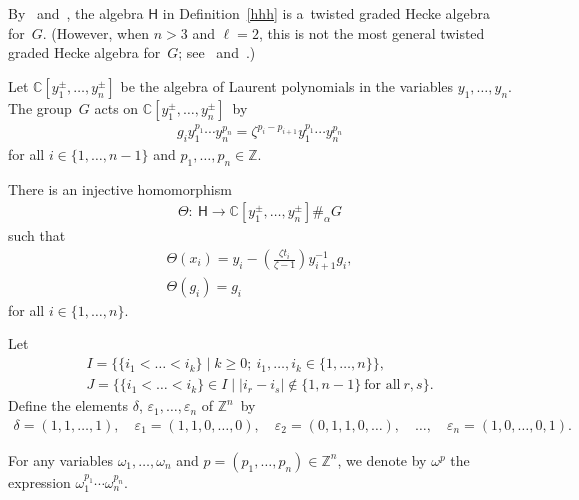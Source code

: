 \begin{Remark}
By~\cite[Theorem 2.10]{W} and~\cite[Example 2.16]{W}, the algebra $\mathsf{H}$ in Def\/inition~\ref{hhh} is a~twisted
graded Hecke algebra for~$G$.
(However, when $n>3$ and $\ell=2$, this is not the most general twisted graded Hecke algebra for~$G$; see~\cite[Example 2.16]{W}
and~\cite[Example 5.1]{W2}.)
\end{Remark}

Let ${\mathbb{C}}[y_1^\pm, \ldots, y_n^\pm]$ be the algebra of Laurent polynomials in the variables $y_1,\ldots, y_n$.
The group~$G$ acts on ${\mathbb{C}}[y_1^\pm, \ldots, y_n^\pm]$~by
\begin{gather*}
g_i y_1^{p_1}\cdots y_n^{p_n} = \zeta^{p_i-p_{i+1}}y_1^{p_1}\cdots y_n^{p_n}
\end{gather*}
for all $i\in\{1,\ldots, n-1\}$ and $p_1,\ldots,p_n\in {\mathbb{Z}}$.

\begin{Proposition}
\label{T1}
There is an injective homomorphism
\begin{gather*}
\Theta: \ \mathsf{H} \longrightarrow {\mathbb{C}}[y_1^\pm, \ldots, y_n^\pm]\#_\alpha G
\end{gather*}
such that
\begin{gather}
\Theta(x_i) = y_i - \left(\frac{\zeta t_i}{\zeta-1} \right) y_{i+1}^{-1}g_i,
\label{theta1}
\\
\Theta(g_i) = g_i
\label{theta3}
\end{gather}
for all $i\in\{1,\ldots, n\}$.
\end{Proposition}

Let
\begin{gather*}
I = \{\{i_1<\dots<i_k\} \mid k\ge 0; \ i_1,\ldots, i_k\in \{1,\dots,n\} \},
\\
J = \{\{i_1<\dots<i_k\}\in I \mid |i_r-i_s|\notin\{1,n-1\}\ \text{for all}\ r, s \}.
\end{gather*}
Def\/ine the elements $\delta$, $\varepsilon_1, \ldots, \varepsilon_n$ of ${\mathbb{Z}}^n$~by
\begin{gather*}
\delta = (1,1,\dots,1),
\quad
\varepsilon_1 = (1,1,0,\dots,0),
\quad
\varepsilon_2 = (0,1,1,0,\dots),
\quad
\ldots,
\quad
\varepsilon_n = (1,0,\dots,0,1).
\end{gather*}

\begin{Notation}
For any variables $\omega_1, \ldots, \omega_n$ and $p=(p_1,\ldots,p_n)\in {\mathbb{Z}}^n$, we denote by $\omega^p$ the
expression $\omega_1^{p_1} \cdots \omega_n^{p_n}$.
\end{Notation}

